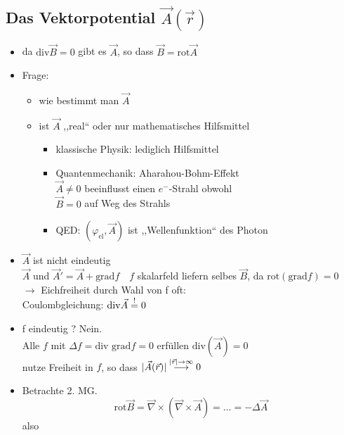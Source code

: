 \documentclass[titlepage,12pt,a4paper,ngerman]{report}
\newcommand{\tx}[1]{\textrm{#1}}
\begin{document}
\subsection{Das Vektorpotential $ \vec{A}(\vec{r}) $}
\begin{itemize}
	\item da $ \tx{div}\vec{B} = 0 $ gibt es $ \vec{A} $, so dass $ \vec{B} = \tx{rot} \vec{A} $
	\item Frage: 
	\begin{itemize}
		\item wie bestimmt man $ \vec{A} $
		\item ist $ \vec{A} $ ,,real`` oder nur mathematisches Hilfsmittel
		\begin{itemize}
			\item klassische Physik: lediglich Hilfsmittel
			\item Quantenmechanik: Aharahou-Bohm-Effekt\\
			$ \vec{A} \neq 0 $ beeinflusst einen $ e^- $-Strahl obwohl\\
			$ \vec{B} = 0 $ auf Weg des Strahls
			\item QED: $ (\varphi_{\tx{el}}, \vec{A}) $ ist ,,Wellenfunktion`` des Photon
		\end{itemize}
	\end{itemize}
	\item $ \vec{A} $ ist nicht eindeutig\\
	$ \vec{A} $ und $ \vec{A}'  = \vec{A} + \tx{grad} f \quad f$ skalarfeld liefern selbes $ \vec{B} $, da $ \tx{rot} ( \tx{grad}f) = 0 $\\
	$ \rightarrow $  Eichfreiheit durch Wahl von f oft:\\
	Coulombgleichung: $ \tx{div} \vec{A} \buildrel ! \over = 0 $
	\item f eindeutig ? Nein.\\
	Alle $ f $ mit $ \Delta f = \tx{div grad} f = 0 $ erfüllen $ \tx{div}(\vec{A}) = 0 $\\
	nutze Freiheit in $ f $, so dass $ |\vec{A}(\vec{r})| \buildrel |\vec{r}| \rightarrow \infty \over \longrightarrow 0 $
	\item  Betrachte 2. MG.
	$$ \tx{rot} \vec{B} = \vec{\nabla} \times (\vec{\nabla} \times \vec{A}) = \dots = - \Delta \vec{A}$$
	also
	\begin{center}
	\end{center}
\end{itemize}
\end{document}
